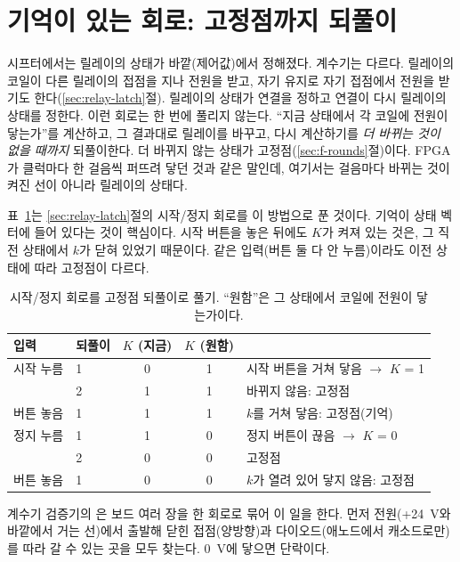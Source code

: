 \section{기억이 있는 회로: 고정점까지 되풀이}\label{sec:v-fixpoint}

\Why 시프터에서는 릴레이의 상태가 바깥(제어값)에서 정해졌다. 계수기는 다르다. 릴레이의 코일이 다른 릴레이의
접점을 지나 전원을 받고, 자기 유지로 자기 접점에서 전원을 받기도 한다(\ref{sec:relay-latch}절). 릴레이의 상태가
연결을 정하고 연결이 다시 릴레이의 상태를 정한다. 이런 회로는 한 번에 풀리지 않는다. ``지금 상태에서 각 코일에
전원이 닿는가''를 계산하고, 그 결과대로 릴레이를 바꾸고, 다시 계산하기를 \emph{더 바뀌는 것이 없을 때까지}
되풀이한다. 더 바뀌지 않는 상태가 고정점(\ref{sec:f-rounds}절)이다. FPGA가 클럭마다 한 걸음씩 퍼뜨려 닿던 것과
같은 말인데, 여기서는 걸음마다 바뀌는 것이 켜진 선이 아니라 릴레이의 상태다.

\General 표~\ref{tab:v-fix}는 \ref{sec:relay-latch}절의 시작/정지 회로를 이 방법으로 푼 것이다. 기억이 상태
벡터에 들어 있다는 것이 핵심이다. 시작 버튼을 놓은 뒤에도 $K$가 켜져 있는 것은, 그 직전 상태에서 $k$가 닫혀
있었기 때문이다. 같은 입력(버튼 둘 다 안 누름)이라도 이전 상태에 따라 고정점이 다르다.

\begin{table}[ht]
\centering
\caption{시작/정지 회로를 고정점 되풀이로 풀기. ``원함''은 그 상태에서 코일에 전원이 닿는가이다.}
\label{tab:v-fix}
\small
\begin{tabular}{llccl}
\toprule
입력 & 되풀이 & $K$ (지금) & $K$ (원함) & \\
\midrule
시작 누름 & 1 & 0 & 1 & 시작 버튼을 거쳐 닿음 $\to$ $K$ = 1 \\
          & 2 & 1 & 1 & 바뀌지 않음: 고정점 \\
버튼 놓음 & 1 & 1 & 1 & $k$를 거쳐 닿음: 고정점(기억) \\
정지 누름 & 1 & 1 & 0 & 정지 버튼이 끊음 $\to$ $K$ = 0 \\
          & 2 & 0 & 0 & 고정점 \\
버튼 놓음 & 1 & 0 & 0 & $k$가 열려 있어 닿지 않음: 고정점 \\
\bottomrule
\end{tabular}
\end{table}

\Ours 계수기 검증기의 은 보드 여러 장을 한 회로로 묶어 이 일을 한다. 먼저 전원(+24~V와 바깥에서 거는
선)에서 출발해 닫힌 접점(양방향)과 다이오드(애노드에서 캐소드로만)를 따라 갈 수 있는 곳을 모두 찾는다. 0~V에
닿으면 단락이다.

